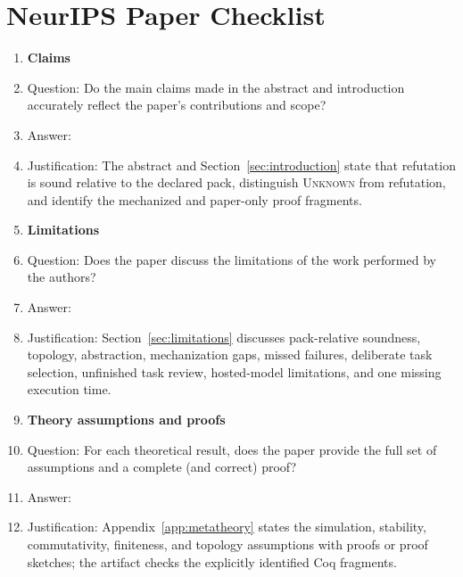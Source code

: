 \section*{NeurIPS Paper Checklist}

\begin{enumerate}

\item {\bf Claims}
    \item[] Question: Do the main claims made in the abstract and introduction accurately reflect the paper's contributions and scope?
    \item[] Answer: \answerYes{}
    \item[] Justification: The abstract and Section~\ref{sec:introduction} state that refutation is sound relative to the declared pack, distinguish \textsc{Unknown} from refutation, and identify the mechanized and paper-only proof fragments.

\item {\bf Limitations}
    \item[] Question: Does the paper discuss the limitations of the work performed by the authors?
    \item[] Answer: \answerYes{}
    \item[] Justification: Section~\ref{sec:limitations} discusses pack-relative soundness, topology, abstraction, mechanization gaps, missed failures, deliberate task selection, unfinished task review, hosted-model limitations, and one missing execution time.

\item {\bf Theory assumptions and proofs}
    \item[] Question: For each theoretical result, does the paper provide the full set of assumptions and a complete (and correct) proof?
    \item[] Answer: \answerYes{}
    \item[] Justification: Appendix~\ref{app:metatheory} states the simulation, stability, commutativity, finiteness, and topology assumptions with proofs or proof sketches; the artifact checks the explicitly identified Coq fragments.


\end{enumerate}
